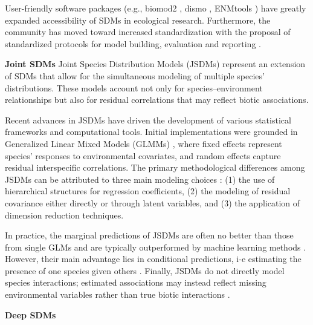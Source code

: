 User-friendly software packages (e.g., biomod2 \cite{thuiller2009biomod}, dismo \cite{hijmans2017package}, ENMtools \cite{warren2010enmtools}) have greatly expanded accessibility of SDMs in ecological research. Furthermore, the community has moved toward increased standardization with the proposal of standardized protocols for model building, evaluation \cite{roberts2017cross,valavi2018blockcv} and reporting \cite{fitzpatrick2021odmap,zurell2020standard}. 


\noindent\textbf{Joint SDMs}
Joint Species Distribution Models (JSDMs) \cite{pollock2014understanding} represent an extension of SDMs that allow for the simultaneous modeling of multiple species’ distributions. These models account not only for species–environment relationships but also for residual correlations that may reflect biotic associations.

Recent advances in JSDMs have driven the development of various statistical frameworks and computational tools. Initial implementations were grounded in Generalized Linear Mixed Models (GLMMs) \cite{pollock2014understanding,ovaskainen2020joint,warton2015so}, where fixed effects represent species’ responses to environmental covariates, and random effects capture residual interspecific correlations. The primary methodological differences among JSDMs can be attributed to three main modeling choices \cite{wilkinson2019comparison}: (1) the use of hierarchical structures for regression coefficients, (2) the modeling of residual covariance either directly or through latent variables, and (3) the application of dimension reduction techniques.

In practice, the marginal predictions of JSDMs are often no better than those from single GLMs \cite{poggiato2021interpretations} and are typically outperformed by machine learning methods \cite{norberg2019comprehensive}. However, their main advantage lies in conditional predictions, i-e estimating the presence of one species given others \cite{wilkinson2021defining}. Finally, JSDMs do not directly model species interactions; estimated associations may instead reflect missing environmental variables rather than true biotic interactions \cite{blanchet2020co}.

\noindent\textbf{Deep SDMs}

